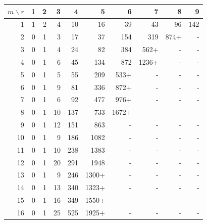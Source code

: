 \begin{tabular}{r|rrrrrrrrr}
$m\backslash r$ & 1 & 2 & 3 & 4 & 5 & 6 & 7 & 8 & 9 \\
\hline
1 & 1 & 2 & 4 & 10 & 16 & 39 & 43 & 96 & 142 \\
2 & 0 & 1 & 3 & 17 & 37 & 154 & 319 & 874+ & - \\
3 & 0 & 1 & 4 & 24 & 82 & 384 & 562+ & - & - \\
4 & 0 & 1 & 6 & 45 & 134 & 872 & 1236+ & - & - \\
5 & 0 & 1 & 5 & 55 & 209 & 533+ & - & - & - \\
6 & 0 & 1 & 9 & 81 & 336 & 872+ & - & - & - \\
7 & 0 & 1 & 6 & 92 & 477 & 976+ & - & - & - \\
8 & 0 & 1 & 10 & 137 & 733 & 1672+ & - & - & - \\
9 & 0 & 1 & 12 & 151 & 863 & - & - & - & - \\
10 & 0 & 1 & 9 & 186 & 1082 & - & - & - & - \\
11 & 0 & 1 & 10 & 238 & 1383 & - & - & - & - \\
12 & 0 & 1 & 20 & 291 & 1948 & - & - & - & - \\
13 & 0 & 1 & 9 & 246 & 1300+ & - & - & - & - \\
14 & 0 & 1 & 13 & 340 & 1323+ & - & - & - & - \\
15 & 0 & 1 & 16 & 349 & 1550+ & - & - & - & - \\
16 & 0 & 1 & 25 & 525 & 1925+ & - & - & - & - \\
\end{tabular}

